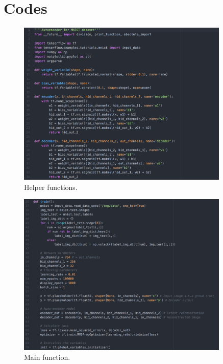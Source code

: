 \documentclass[a4paper]{article}
\begin{document}
\section{Codes}
\begin{figure}[H]
\centering
\includegraphics[width=0.9\textwidth]{1.png}
\caption{\label{fig:data}Helper functions.}
\end{figure}
\begin{figure}[H]
\centering
\includegraphics[width=0.9\textwidth]{2.png}
\caption{\label{fig:data}Main function.}
\end{figure}
\end{document}
